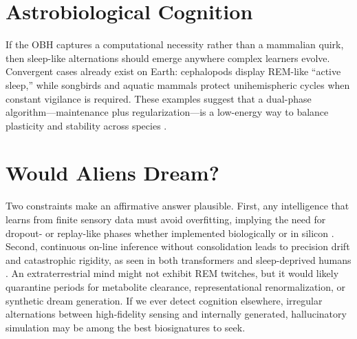\section{Astrobiological Cognition}\label{sec:astrobiology_cognition}
If the OBH captures a computational necessity rather than a mammalian quirk, then sleep-like alternations should emerge anywhere
complex learners evolve. Convergent cases already exist on Earth: cephalopods display REM-like ``active sleep,'' while songbirds
and aquatic mammals protect unihemispheric cycles when constant vigilance is required. These examples suggest that a dual-phase
algorithm---maintenance plus regularization---is a low-energy way to balance plasticity and stability across species \citep{hoel2021overfitted}.

\section{Would Aliens Dream?}\label{sec:aliens_dream}
Two constraints make an affirmative answer plausible. First, any intelligence that learns from finite sensory data must avoid
overfitting, implying the need for dropout- or replay-like phases whether implemented biologically or in silicon \citep{franklin2023precision}.
Second, continuous on-line inference without consolidation leads to precision drift and catastrophic rigidity, as seen in both
transformers and sleep-deprived humans \citep{chen2023attention_sink}. An extraterrestrial mind might not exhibit REM twitches, but it
would likely quarantine periods for metabolite clearance, representational renormalization, or synthetic dream generation. If we
ever detect cognition elsewhere, irregular alternations between high-fidelity sensing and internally generated, hallucinatory
simulation may be among the best biosignatures to seek.

